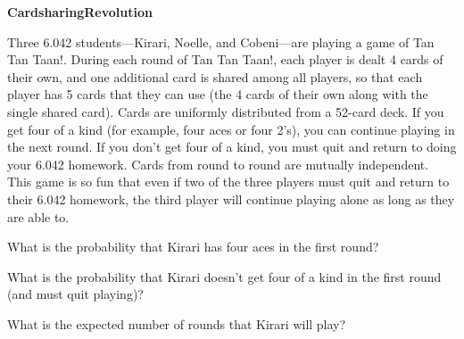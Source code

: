 \documentclass[12pt,oneside]{article}
\newcommand{\ptitle}[1]{\textbf{\hspace{0.2cm}#1}}
\begin{document}
\instatements{\newpage}
\begin{problem}{25}\label{cards} \ptitle{Cardsharing\kstar Revolution}

Three 6.042 students---Kirari, Noelle, and Cobeni---are
 playing a game of Tan Tan Taan!.  During each round of Tan Tan Taan!, 
each player is dealt 4 cards of their own, and one additional card is shared among all  players, so that each
player has 5 cards that they can use (the 4 cards of their own along with the single shared card).
  Cards are uniformly distributed from a 52-card deck.
 If you get four of a kind (for example, four aces or four 2's),
you can continue playing in the next round.  If you don't get four of a kind,
you must quit and return to doing your 6.042 homework. Cards from round to round are mutually
independent.  This game is so fun that even if two of the three players must quit and return to their 6.042 homework, the third
player will continue playing alone as long as they are able to.

\bparts

 What is the probability that Kirari has four aces in the first round?


 What is the probability that Kirari doesn't get four of a kind in the first round (and must quit playing)?



\instatements{\newpage}
 What is the expected number of rounds that Kirari will
play?



\end{problem}
\end{document}
